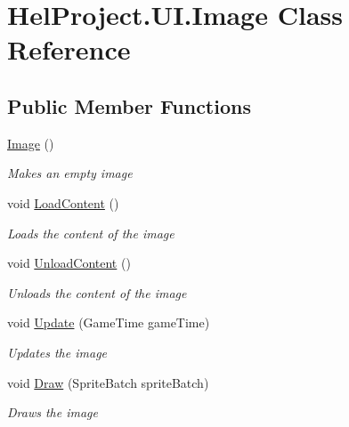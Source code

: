 \hypertarget{class_hel_project_1_1_u_i_1_1_image}{}\section{Hel\+Project.\+U\+I.\+Image Class Reference}
\label{class_hel_project_1_1_u_i_1_1_image}
\subsection*{Public Member Functions}
\begin{DoxyCompactItemize}
\item 
\hyperlink{class_hel_project_1_1_u_i_1_1_image_a5f0954bae0cb16899551a81480d8a420}{Image} ()
\begin{DoxyCompactList}\small\item\em Makes an empty image \end{DoxyCompactList}\item 
void \hyperlink{class_hel_project_1_1_u_i_1_1_image_a517e2fd4cb581e1ce1ebe85773eb4518}{Load\+Content} ()
\begin{DoxyCompactList}\small\item\em Loads the content of the image \end{DoxyCompactList}\item 
void \hyperlink{class_hel_project_1_1_u_i_1_1_image_a3de3a8929071c6f6b981d513b262be2a}{Unload\+Content} ()
\begin{DoxyCompactList}\small\item\em Unloads the content of the image \end{DoxyCompactList}\item 
void \hyperlink{class_hel_project_1_1_u_i_1_1_image_af0539f16f79a2d2d01b2bb679a4db735}{Update} (Game\+Time game\+Time)
\begin{DoxyCompactList}\small\item\em Updates the image \end{DoxyCompactList}\item 
void \hyperlink{class_hel_project_1_1_u_i_1_1_image_a55d2594f74f1b32a6fe3672e020d0e98}{Draw} (Sprite\+Batch sprite\+Batch)
\begin{DoxyCompactList}\small\item\em Draws the image \end{DoxyCompactList}\end{DoxyCompactItemize}

